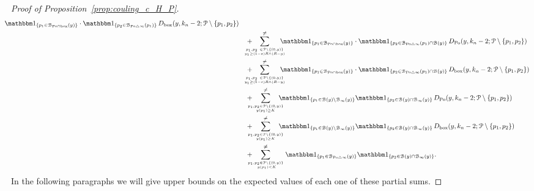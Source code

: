\begin{proof}[Proof of Proposition~\ref{prop:couling_c_H_P}]
\begin{align}
		\hspace{-10pt} \ind{p_1 \in \BallInter{y}} \cdot \ind{p_2 \in \BallSym{p_1}} 
		\, D_{\text{box}} (y,k_n-2;\Pcal \setminus \{ p_1,p_2\}) \label{eq:sum_2}\\
	&\hspace{10pt}+  \hspace{-15pt} \sum_{p_1,p_2 \ \in \Pcal \setminus \{(0,y) \} 
		\atop y_1 \geq (1-\eps) R \wedge (R-y)}^{\ne} \hspace{-10pt}
		\ind{p_1 \in \BallInter{y}} \cdot \ind{p_2 \in \BallSym{p_1}\cap \BallHyp{y}} 
		\, D_{\Po} (y,k_n-2;\Pcal \setminus \{ p_1,p_2\}) \label{eq:sum_3} \\
	&\hspace{10pt}+ \hspace{-15pt} \sum_{p_1,p_2 \ \in \Pcal \setminus \{(0,y) \} 
		\atop y_1 \geq (1-\eps) R \wedge (R-y)}^{\ne} \hspace{-10pt}
		\ind{p_1 \in \BallInter{y}} \cdot \ind{p_2 \in \BallSym{p_1}\cap \BallHyp{y}} 
		\, D_{\text{box}} (y,k_n-2;\Pcal \setminus \{ p_1,p_2\}) \label{eq:sum_4} \\
	&\hspace{10pt}+ \hspace{-10pt} \sum_{p_1,p_2 \in\Pcal \setminus \{(0,y)\} 
		\atop y(p_1) \geq K}^{\ne} \hspace{-10pt} \ind{p_1\in \BallHyp{y}\setminus \BallPo{y}} \ind{p_2\in \BallHyp{y}\cap \BallPo{y}} 
		\, D_{\Po} (y,k_n-2;\Pcal \setminus \{ p_1,p_2\}) \label{eq:sum_5}\\
	&\hspace{10pt}+ \hspace{-10pt} \sum_{p_1,p_2 \in\Pcal \setminus \{(0,y)\} 
			\atop y(p_1) \geq K}^{\ne} \hspace{-10pt} \ind{p_1\in \BallHyp{y}\setminus \BallPo{y}} \ind{p_2\in \BallHyp{y}\cap \BallPo{y}} 
			\, D_{\text{box}} (y,k_n-2;\Pcal \setminus \{ p_1,p_2\}) \label{eq:sum_5b}\\
	&\hspace{10pt}+ \hspace{-10pt} \sum_{p_1,p_2 \in\Pcal \setminus \{(0,y)\} \atop \ y(p_1) < K}^{\ne}
		\ind{p_1\in \BallSym{y}} \ind{p_2\in \BallHyp{y}\cap \BallPo{y}}. \label{eq:sum_6}
\end{align}
In the following paragraphs we will give upper bounds on the expected values of each one of these partial sums. 


\end{proof}
